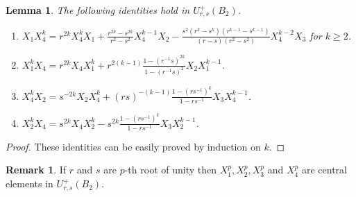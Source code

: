 \documentclass[12 pt,reqno]{amsart}
\numberwithin{equation}{section}
\newtheorem{lemma}[thm]{Lemma}
\theoremstyle{definition}
\newtheorem{remark}[thm]{Remark}
\theoremstyle{definition}
\theoremstyle{remark}
\theoremstyle{remark}
\begin{document}
\begin{lemma}\label{lemma2.2}
    The following identities hold in $ U_{r,s}^+(B_2) $.
    \begin{enumerate}[label= \((\arabic*)\)]
    \item $X_1X_4^k=r^{2k}X_4^kX_1+\displaystyle\frac{r^{2k}-s^{2k}}{r^2-s^2}X_4^{k-1}X_2-\frac{s^2\left(r^k-s^k\right)\left(r^{k-1}-s^{k-1}\right)}{\left(r-s\right)\left(r^2-s^2\right)}X_4^{k-2}X_3$ for $k \geq 2$.
        \item $X_1^kX_4=r^{2k}X_4X_1^k+r^{2(k-1)}\displaystyle\frac{1-(r^{-1}s)^{2k}}{1-(r^{-1}s)^2}X_2X_1^{k-1}$.
        \item $X_4^kX_2=s^{-2k}X_2X_4^k+(rs)^{-(k-1)}\displaystyle\frac{1-(rs^{-1})^k}{1-rs^{-1}}X_3X_4^{k-1}$.
        \item $X_2^kX_4=s^{2k}X_4X_2^k-s^{2k}\displaystyle\frac{1-(rs^{-1})^{k}}{1-rs^{-1}}X_3X_2^{k-1}$.
    \end{enumerate}
\end{lemma}
\begin{proof}
    These identities can be easily proved by induction on $k$.
\end{proof}
\begin{remark}\label{rem2} If $r$ and $s$ are $p$-th root of unity then
    $X_1^p, X_2^p,X_3^p$ and $X_4^p$ are central elements in $ U_{r,s}^+(B_2)$.
\end{remark}
\end{document}
